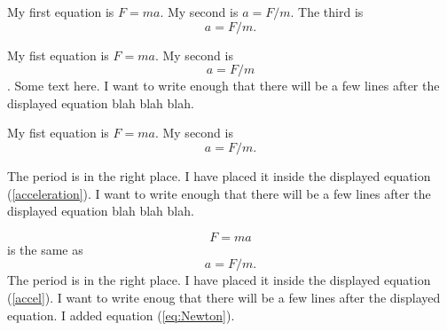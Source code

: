 \documentclass[11pt]{article}
\begin{document}
My first equation is $F=ma$. My second is \(a=F/m\). The third is \[a=F/m.\]

My fist equation is $F=ma$. My second is \[ a=F/m\].
Some text here. I want to write enough that
there will be a few
lines after the displayed equation blah blah blah.

My fist equation is $F=ma$. My second is
\begin{equation}
\label{acceleration}
a=F/m.
\end{equation}

The period is in the right place. I have placed it inside
the displayed equation (\ref{acceleration}). I want to write enough that
there will be a few lines after the displayed equation
blah blah blah.

\begin{equation}
\label{eq:Newton}
F=ma
\end{equation}
is the same as
\begin{equation}
\label{accel}
a=F/m.
\end{equation}
The period is in the right place. I have placed it inside
the displayed equation (\ref{accel}). I want to write enoug
that there will be a few lines after the displayed equation. 
I added equation (\ref{eq:Newton}).
\end{document}
